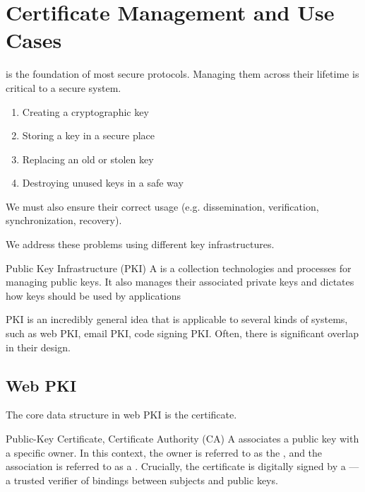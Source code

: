 \chapter{Certificate Management and Use Cases}

 is the foundation of most secure protocols. Managing them across their lifetime is critical to a secure system.
\begin{enumerate}[noitemsep]
    \item Creating a cryptographic key
    \item Storing a key in a secure place
    \item Replacing an old or stolen key
    \item Destroying unused keys in a safe way
\end{enumerate}
We must also ensure their correct usage (e.g. dissemination, verification, synchronization, recovery).

We address these problems using different key infrastructures.

\begin{dfnbox}{Public Key Infrastructure (PKI)}
    A  is a collection technologies and processes for managing public keys. It also manages their associated private keys and dictates how keys should be used by applications
\end{dfnbox}


PKI is an incredibly general idea that is applicable to several kinds of systems, such as web PKI, email PKI, code signing PKI. Often, there is significant overlap in their design.

\section{Web PKI}
The core data structure in web PKI is the certificate.

\begin{dfnbox}{Public-Key Certificate, Certificate Authority (CA)}{}
    A  associates a public key with a specific owner. In this context, the owner is referred to as the , and the association is referred to as a . Crucially, the certificate is digitally signed by a ---a trusted verifier of bindings between subjects and public keys.
\end{dfnbox}

